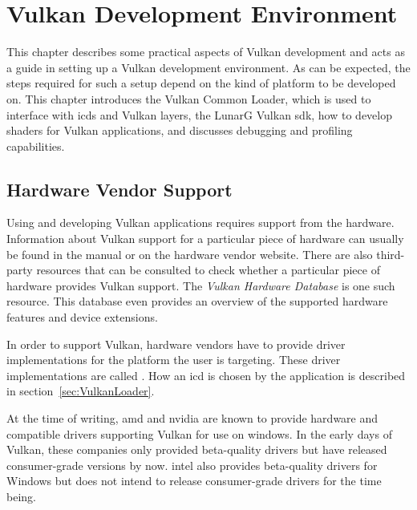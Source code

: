 
\chapter{Vulkan Development Environment}
\label{cha:EnvSetup}



  This chapter describes some practical aspects of Vulkan development and acts as a guide in setting up a Vulkan development environment.
  As can be expected, the steps required for such a setup depend on the kind of platform to be developed on.
  This chapter introduces the Vulkan Common Loader, which is used to interface with \glspl{icd} and Vulkan layers, the LunarG Vulkan \gls{sdk}, how to develop shaders for Vulkan applications, and discusses debugging and profiling capabilities.

  \section{Hardware Vendor Support}
  \label{sec:HardwareVendorSupport}
    Using and developing Vulkan applications requires support from the hardware.
    Information about Vulkan support for a particular piece of hardware can usually be found in the manual or on the hardware vendor website.
    There are also third-party resources that can be consulted to check whether a particular piece of hardware provides Vulkan support.
    The \textit{Vulkan Hardware Database}\cite{vulkangpuinfo} is one such resource.
    This database even provides an overview of the supported hardware features and device extensions.

    In order to support Vulkan, hardware vendors have to provide driver implementations for the platform the user is targeting.
    These driver implementations are called .
    How an \gls{icd} is chosen by the application is described in section~\ref{sec:VulkanLoader}.


    At the time of writing, \gls{amd} and \gls{nvidia} are known to provide hardware and compatible drivers supporting Vulkan for use on \gls{windows}.
    In the early days of Vulkan, these companies only provided beta-quality \glspl{driver} but have released consumer-grade versions by now.
    \gls{intel} also provides beta-quality drivers for Windows but does not intend to release consumer-grade \glspl{driver} for the time being\cite{intelvulkandriversonwindows}.

